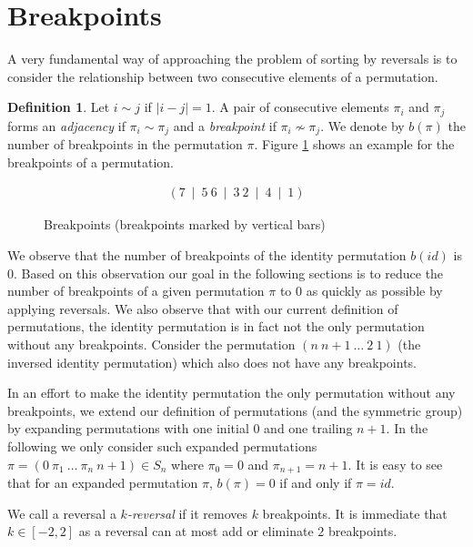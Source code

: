 \documentclass[11pt,DIV=11]{scrartcl}
\theoremstyle{definition}
\newtheorem{definition}[theorem]{Definition}
\theoremstyle{remark}
\begin{document}
\section{Breakpoints}
\label{sec:breakpoints}

A very fundamental way of approaching the problem of sorting by reversals is to consider the relationship between two consecutive elements of a permutation.

\begin{definition}
Let $i \sim j$ if $|i - j| = 1$. A pair of consecutive elements $\pi_i$ and $\pi_j$ forms an \textit{adjacency} if $\pi_i \sim \pi_j$ and a \textit{breakpoint} if $\pi_i \not\sim \pi_j$. We denote by $b(\pi)$ the number of breakpoints in the permutation $\pi$. Figure \ref{fig:breakpoints} shows an example for the breakpoints of a permutation.
\end{definition}

\begin{figure}
    \begin{align*}
        (7\ \mid\ 5\ 6\ \mid\ 3\ 2\ \mid\ 4\ \mid\ 1)
    \end{align*}
    \caption{Breakpoints (breakpoints marked by vertical bars)}
    \label{fig:breakpoints}
\end{figure}

We observe that the number of breakpoints of the identity permutation $b(id)$ is $0$. Based on this observation our goal in the following sections is to reduce the number of breakpoints of a given permutation $\pi$ to $0$ as quickly as possible by applying reversals. We also observe that with our current definition of permutations, the identity permutation is in fact not the only permutation without any breakpoints. Consider the permutation $(n\ n+1\ \dots\ 2\ 1)$ (the inversed identity permutation) which also does not have any breakpoints.

In an effort to make the identity permutation the only permutation without any breakpoints, we extend our definition of permutations (and the symmetric group) by expanding permutations with one initial $0$ and one trailing $n+1$. In the following we only consider such expanded permutations $\pi = (0\ \pi_1\ \dots\ \pi_n\ n+1) \in S_n$ where $\pi_0 = 0$ and $\pi_{n+1} = n+1$. It is easy to see that for an expanded permutation $\pi$, $b(\pi) = 0$ if and only if $\pi = id$.

We call a reversal a \textit{$k$-reversal} if it removes $k$ breakpoints. It is immediate that $k \in [-2,2]$ as a reversal can at most add or eliminate $2$ breakpoints.
\end{document}
